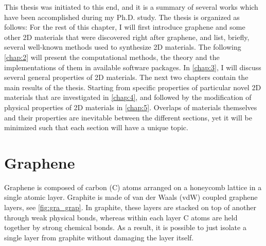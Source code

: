 This thesis was initiated to this end, and it is a summary of several works which have been accomplished during my Ph.D. study. The thesis is organized as follows: For the rest of this chapter, I will first introduce graphene and some other 2D materials that were discovered right after graphene, and list, briefly, several well-known methods used to synthesize 2D materials. The following \autoref{chap:2} will present the computational methods, the theory and the implementations of them in available software packages. In \autoref{chap:3}, I will discuss several general properties of 2D materials. The next two chapters contain the main results of the thesis. Starting from specific properties of particular novel 2D materials that are investigated in \autoref{chap:4}, and followed by the modification of physical properties of 2D materials in \autoref{chap:5}. Overlaps of materials themselves and their properties are inevitable between the different sections, yet it will be minimized such that each section will have a unique topic.

\section{Graphene}

Graphene is composed of carbon (C) atoms arranged on a honeycomb lattice in a single atomic layer. Graphite is made of van der Waals (vdW) coupled graphene layers, see \autoref{fig:gra_grap}. In graphite, these layers are stacked on top of another through weak physical bonds, whereas within each layer C atoms are held together by strong chemical bonds. As a result, it is possible to just isolate a single layer from graphite without damaging the layer itself. 

